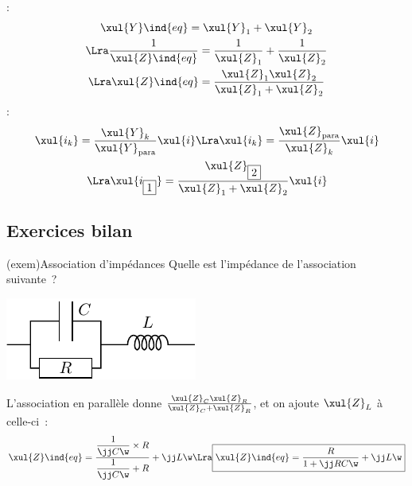 \documentclass[../../main/main.tex]{subfiles}
\begin{document}
\begin{tcb}[tabularx={p{.5cm}|Y|Y}, heart]
	\begin{itemize}
		 :
		\begin{gather*}
			\xul{Y}\ind{eq} = \xul{Y}_1 + \xul{Y}_2\\
			\Lra
			\frac{1}{\xul{Z}\ind{eq}} = \frac{1}{\xul{Z}_1} + \frac{1}{\xul{Z}_2}\\
			\Lra
			\xul{Z}\ind{eq} = \frac{\xul{Z}_1\xul{Z}_2}{\xul{Z}_1+\xul{Z}_2}
		\end{gather*}
		 :
		\begin{gather*}
			\xul{i_k} = \frac{\xul{Y}_k}{\xul{Y}_{\rm para}}\xul{i}
			\Lra
			\xul{i_k} = \frac{\xul{Z}_{\rm para}}{\xul{Z}_k}\xul{i}\\
			\Lra
			\xul{i_{\fbox{1}}} = \frac{\xul{Z}_{\fbox{2}}}{\xul{Z}_1 + \xul{Z}_2}\xul{i}
		\end{gather*}
	\end{itemize}
\end{tcb}

\subsection{Exercices bilan}
\begin{tcb}[sidebyside, righthand ratio=.7](exem){Association d'impédances}
	Quelle est l'impédance de l'association suivante~?
	\begin{center}
		\includegraphics[width=\linewidth]{exo_zeq}
	\end{center}
	\tcblower
	L'association en parallèle donne
	$\frac{\xul{Z}_C\xul{Z}_R}{\xul{Z}_C+\xul{Z}_R}$, et on ajoute $\xul{Z}_L$ à
	celle-ci~:
	\begin{gather*}
		\xul{Z}\ind{eq}
		= \frac{\dfrac{1}{\jj C\w}\times R}{\dfrac{1}{\jj C\w} + R}
		+ \jj L\w
		\Lra
		\boxed{
			\xul{Z}\ind{eq} = \frac{R}{1+\jj RC\w} + \jj L\w}
	\end{gather*}
\end{tcb}
\end{document}
